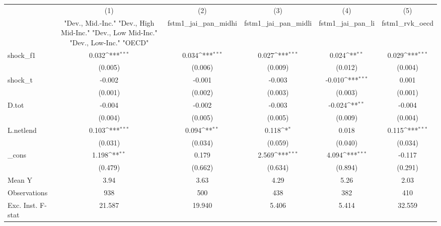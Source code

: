 {
\def\sym#1{\ifmmode^{#1}\else\(^{#1}\)\fi}
\begin{tabular}{l*{5}{c}}
\toprule
            &\multicolumn{1}{c}{(1)}&\multicolumn{1}{c}{(2)}&\multicolumn{1}{c}{(3)}&\multicolumn{1}{c}{(4)}&\multicolumn{1}{c}{(5)}\\
            &\multicolumn{1}{c}{ "Dev., Mid.-Inc." "Dev., High Mid-Inc." "Dev., Low Mid-Inc." "Dev., Low-Inc." "OECD" }&\multicolumn{1}{c}{fstm1\_jai\_pan\_midhi}&\multicolumn{1}{c}{fstm1\_jai\_pan\_midli}&\multicolumn{1}{c}{fstm1\_jai\_pan\_li}&\multicolumn{1}{c}{fstm1\_rvk\_oecd}\\
\midrule
shock\_f1    &       0.032\sym{***}&       0.034\sym{***}&       0.027\sym{***}&       0.024\sym{**} &       0.029\sym{***}\\
            &     (0.005)         &     (0.006)         &     (0.009)         &     (0.012)         &     (0.004)         \\
\addlinespace
shock\_t     &      -0.002         &      -0.001         &      -0.003         &      -0.010\sym{***}&       0.001         \\
            &     (0.001)         &     (0.002)         &     (0.003)         &     (0.003)         &     (0.001)         \\
\addlinespace
D.tot       &      -0.004         &      -0.002         &      -0.003         &      -0.024\sym{**} &      -0.004         \\
            &     (0.004)         &     (0.005)         &     (0.005)         &     (0.009)         &     (0.004)         \\
\addlinespace
L.netlend   &       0.103\sym{***}&       0.094\sym{**} &       0.118\sym{*}  &       0.018         &       0.115\sym{***}\\
            &     (0.031)         &     (0.034)         &     (0.059)         &     (0.040)         &     (0.034)         \\
\addlinespace
\_cons      &       1.198\sym{**} &       0.179         &       2.569\sym{***}&       4.094\sym{***}&      -0.117         \\
            &     (0.479)         &     (0.662)         &     (0.634)         &     (0.894)         &     (0.291)         \\
\midrule
Mean Y      &        3.94         &        3.63         &        4.29         &        5.26         &        2.03         \\
Observations&         938         &         500         &         438         &         382         &         410         \\
Exc. Inst. F-stat&      21.587         &      19.940         &       5.406         &       5.414         &      32.559         \\
\bottomrule
\end{tabular}
}
